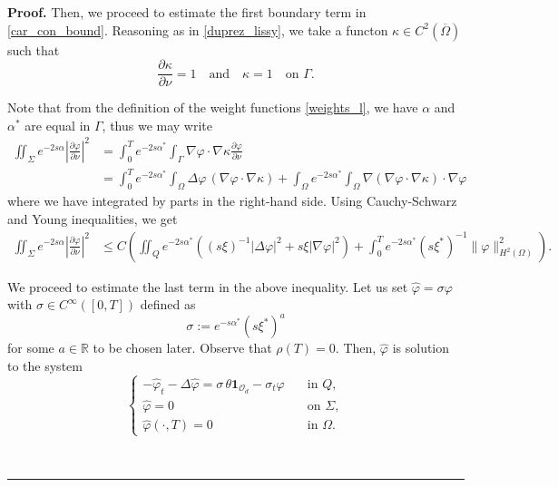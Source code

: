 \documentclass[preprint,10pt]{article}
\newenvironment{proof}[1][Proof]{\noindent\textbf{#1.} }{\ \rule{0.5em}{0.5em}}
\numberwithin{equation}{section}
\numberwithin{theorem}{section}
\begin{document}
{\begin{proof}
Then, we proceed to estimate the first boundary term in \eqref{car_con_bound}. Reasoning as in \eqref{duprez_lissy}, we take a functon $\kappa\in C^2(\overline \Omega)$ such that
%
\begin{equation}
\frac{\partial \kappa}{\partial \nu}=1 \quad\text{and}\quad \kappa=1 \quad \text{on } \Gamma.
\end{equation}

Note that from the definition of the weight functions \eqref{weights_l}, we have $\alpha$ and $\alpha^*$ are equal in $\Gamma$, thus we may write
%
\begin{equation}
\begin{split}
\iint_{\Sigma}e^{-2s\alpha}\left|\frac{\partial \varphi}{\partial \nu}\right|^2&=\int_{0}^{T}e^{-2s\alpha^*}\int_\Gamma\nabla\varphi\cdot \nabla \kappa\frac{\partial \varphi}{\partial \nu} \\
&=\int_{0}^{T}e^{-2s\alpha^*}\int_{\Omega}\Delta \varphi\,(\nabla\varphi\cdot \nabla \kappa)+\int_{\Omega}e^{-2s\alpha^*}\int_\Omega\nabla (\nabla\varphi\cdot\nabla\kappa)\cdot\nabla \varphi
\end{split}
\end{equation}
%
where we have integrated by parts in the right-hand side. Using Cauchy-Schwarz and Young inequalities, we get
%
\begin{equation}\label{estimate_1}
\begin{split}
\iint_{\Sigma}e^{-2s\alpha}\left|\frac{\partial \varphi}{\partial \nu}\right|^2&\leq C\left(\iint_Q e^{-2s\alpha^*}\left((s\xi)^{-1}|\Delta \varphi|^2 + s\xi|\nabla \varphi|^2\right)+\int_{0}^{T}e^{-2s\alpha^*}(s\xi^*)^{-1}\|\varphi\|^2_{H^2(\Omega)}\right).
\end{split}
\end{equation}

We proceed to estimate the last term in the above inequality. Let us set $\widehat \varphi=\sigma\varphi$ with $\sigma\in C^\infty([0,T])$ defined as
%
\begin{equation}\label{rho_def}
\sigma:=e^{-s\alpha^*}(s\xi^*)^a
\end{equation}
%
for some $a\in \mathbb R$ to be chosen later. Observe that $\rho(T)=0$. Then, $\widehat{\varphi}$ is solution to the system
%
\begin{equation}\label{phi_gorro}
\begin{cases}
-\widehat\varphi_t-\Delta \widehat\varphi=\sigma\,\theta\mathbf{1}_{\mathcal O_d}-\sigma_t\varphi \quad& \text{in } Q, \\
\widehat\varphi=0 \quad& \text{on } \Sigma, \\
\widehat{\varphi}(\cdot,T)=0 \quad&\text{in } \Omega.
\end{cases}
\end{equation}
 

\end{proof}}
\end{document}

